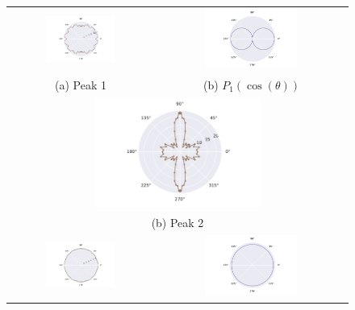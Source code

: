 \begin{figure}[H]
  \centering
  \begin{tabular}{cc}
  \includegraphics[width=0.5\textwidth]{Daten/Wasserstoffmolekuelion/neu/peak0.pdf} &   \includegraphics[width=0.5\textwidth]{Daten/Wasserstoff/peakLeg0.pdf}\\[6pt]
  (a)  Peak 1 & (b)  $P_1(\cos(\theta))$ \\[6pt]
  \multicolumn{2}{c}{\includegraphics[width=0.5\textwidth]{Daten/Wasserstoffmolekuelion/neu/peak1.pdf}}\\[6pt]
  \multicolumn{2}{c}{(b) Peak 2}\\[6pt]
  \includegraphics[width=0.5\textwidth]{Daten/Wasserstoffmolekuelion/neu/peak2.pdf} &   \includegraphics[width=0.5\textwidth]{Daten/Wasserstoffmolekuelion/peakLeg.pdf}\\[6pt]

\end{tabular}
\end{figure}
